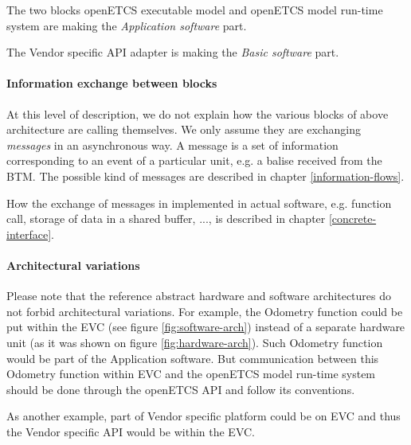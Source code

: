 The two blocks openETCS executable model and openETCS model run-time
system are making the \emph{Application software} part.

The Vendor specific API adapter is making the \emph{Basic software}
part.

\paragraph{Information exchange between blocks}
At this level of description, we do not explain how the various blocks
of above architecture are calling themselves. We only assume they are
exchanging \emph{messages} in an asynchronous way. A message is a set
of information corresponding to an event of a particular unit, e.g. a
balise received from the BTM. The possible kind of messages are
described in chapter \ref{information-flows}.

How the exchange of messages in implemented in actual software,
e.g. function call, storage of data in a shared buffer, ..., is
described in chapter \ref{concrete-interface}.

\paragraph{Architectural variations}
Please note that the reference abstract hardware and software
architectures do not forbid architectural variations. For example, the
Odometry function could be put within the EVC (see figure
\ref{fig:software-arch}) instead of a separate hardware unit (as it
was shown on figure \ref{fig:hardware-arch}). Such Odometry function
would be part of the Application software. But communication between
this Odometry function within EVC and the openETCS model run-time
system should be done through the openETCS API and follow its
conventions.

As another example, part of Vendor specific platform could be on EVC
and thus the Vendor specific API would be within the EVC.


